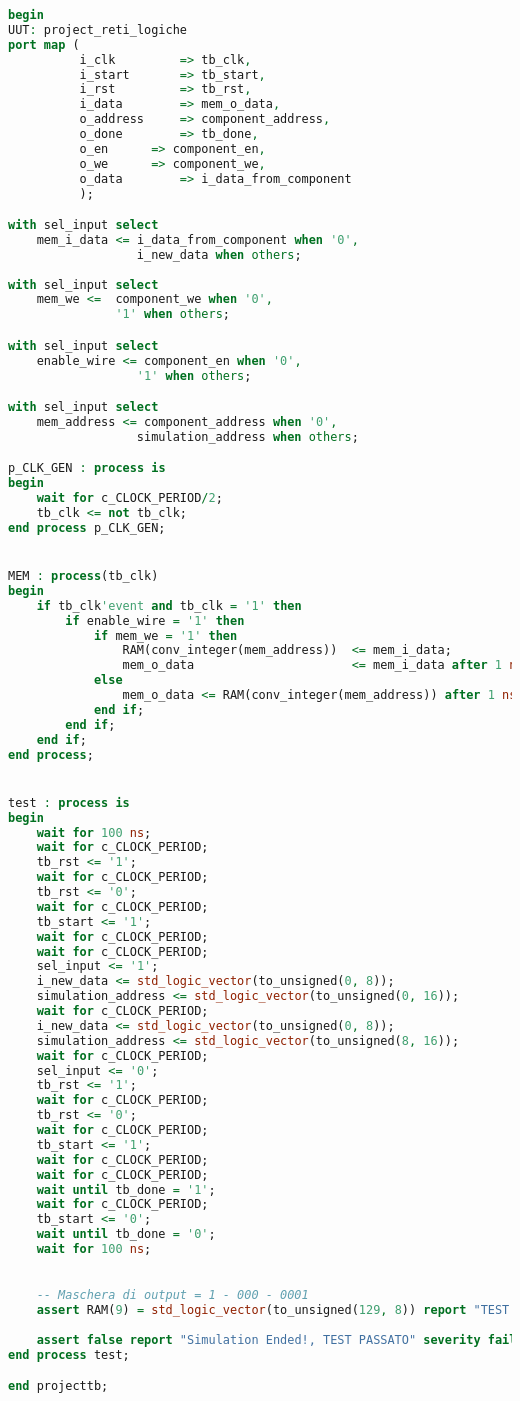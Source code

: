 \documentclass [a4paper, 12pt]{article}
\begin{document}
\begin{lstlisting}[language=VHDL, caption=tb\_pfrl\_2020\_repeated.vhd, basicstyle=\tiny, breaklines]
begin
UUT: project_reti_logiche
port map (
          i_clk      	=> tb_clk,
          i_start       => tb_start,
          i_rst      	=> tb_rst,
          i_data    	=> mem_o_data,
          o_address  	=> component_address,
          o_done      	=> tb_done,
          o_en   	=> component_en,
          o_we 		=> component_we,
          o_data    	=> i_data_from_component
          );

with sel_input select
    mem_i_data <= i_data_from_component when '0',
                  i_new_data when others;
                  
with sel_input select
    mem_we <=  component_we when '0',
               '1' when others;

with sel_input select
    enable_wire <= component_en when '0',
                  '1' when others;

with sel_input select
    mem_address <= component_address when '0',
                  simulation_address when others;

p_CLK_GEN : process is
begin
    wait for c_CLOCK_PERIOD/2;
    tb_clk <= not tb_clk;
end process p_CLK_GEN;


MEM : process(tb_clk)
begin
    if tb_clk'event and tb_clk = '1' then
        if enable_wire = '1' then
            if mem_we = '1' then
                RAM(conv_integer(mem_address))  <= mem_i_data;
                mem_o_data                      <= mem_i_data after 1 ns;
            else
                mem_o_data <= RAM(conv_integer(mem_address)) after 1 ns;
            end if;
        end if;
    end if;
end process;


test : process is
begin 
    wait for 100 ns;
    wait for c_CLOCK_PERIOD;
    tb_rst <= '1';
    wait for c_CLOCK_PERIOD;
    tb_rst <= '0';
    wait for c_CLOCK_PERIOD;
    tb_start <= '1';
    wait for c_CLOCK_PERIOD;
    wait for c_CLOCK_PERIOD;
    sel_input <= '1';    
    i_new_data <= std_logic_vector(to_unsigned(0, 8));
    simulation_address <= std_logic_vector(to_unsigned(0, 16));
    wait for c_CLOCK_PERIOD;
    i_new_data <= std_logic_vector(to_unsigned(0, 8));
    simulation_address <= std_logic_vector(to_unsigned(8, 16));
    wait for c_CLOCK_PERIOD;
    sel_input <= '0';
    tb_rst <= '1';
    wait for c_CLOCK_PERIOD;
    tb_rst <= '0';
    wait for c_CLOCK_PERIOD;
    tb_start <= '1';
    wait for c_CLOCK_PERIOD;
    wait for c_CLOCK_PERIOD;
    wait until tb_done = '1';
    wait for c_CLOCK_PERIOD;
    tb_start <= '0';
    wait until tb_done = '0';
    wait for 100 ns;

    
    -- Maschera di output = 1 - 000 - 0001
    assert RAM(9) = std_logic_vector(to_unsigned(129, 8)) report "TEST FALLITO. Expected  64  found " & integer'image(to_integer(unsigned(RAM(9))))  severity failure;
    
    assert false report "Simulation Ended!, TEST PASSATO" severity failure;
end process test;

end projecttb; 


\end{lstlisting}
\end{document}
